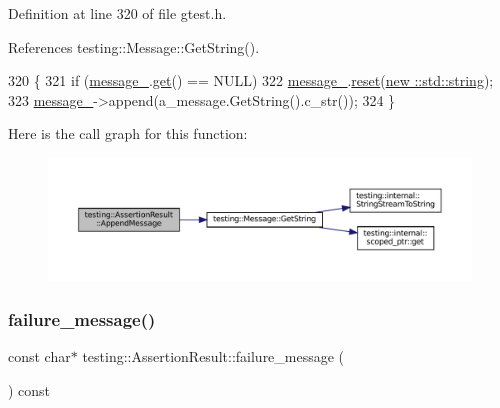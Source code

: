 Definition at line 320 of file gtest.\+h.



References testing\+::\+Message\+::\+Get\+String().


\begin{DoxyCode}
320                                                \{
321     \textcolor{keywordflow}{if} (\hyperlink{classtesting_1_1AssertionResult_a5dee995939457def35f0bf496d070957}{message\_}.\hyperlink{classtesting_1_1internal_1_1scoped__ptr_aa5984291e12453f1e81b7676d1fa26fd}{get}() == NULL)
322       \hyperlink{classtesting_1_1AssertionResult_a5dee995939457def35f0bf496d070957}{message\_}.\hyperlink{classtesting_1_1internal_1_1scoped__ptr_acac03266a43359801aff0de5c990bec0}{reset}(\hyperlink{namespacetesting_1_1internal_a8e8ff5b11e64078831112677156cb111}{new ::std::string});
323     \hyperlink{classtesting_1_1AssertionResult_a5dee995939457def35f0bf496d070957}{message\_}->append(a\_message.GetString().c\_str());
324   \}
\end{DoxyCode}
Here is the call graph for this function\+:
\nopagebreak
\begin{figure}[H]
\begin{center}
\leavevmode
\includegraphics[width=350pt]{classtesting_1_1AssertionResult_a5b55e01f1321d744a594dbe51d46a139_cgraph}
\end{center}
\end{figure}
\mbox{\label{classtesting_1_1AssertionResult_aa38908d5a48c912434a80c8725f52583}} 
\subsubsection{\texorpdfstring{failure\+\_\+message()}{failure\_message()}}
{\footnotesize\ttfamily const char$\ast$ testing\+::\+Assertion\+Result\+::failure\+\_\+message (\begin{DoxyParamCaption}{ }\end{DoxyParamCaption}) const\hspace{0.3cm}{\ttfamily [inline]}}




